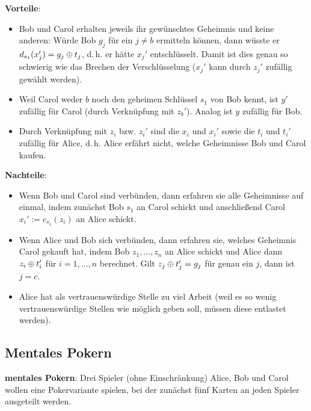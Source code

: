 \textbf{Vorteile}:
\begin{itemize}
    \item
    Bob und Carol erhalten jeweils ihr gewünschtes Geheimnis und keine anderen:
    Würde Bob $g_j$ für ein $j \not= b$ ermitteln können, dann wüsste er
    $d_{s_1}(x_j') = g_j \oplus t_j$, d.\,h. er hätte $x_j'$ entschlüsselt.
    Damit ist dies genau so schwierig wie das Brechen der Verschlüsselung
    ($x_j'$ kann durch $z_j'$ zufällig gewählt werden).

    \item
    Weil Carol weder $b$ noch den geheimen Schlüssel $s_1$ von Bob kennt,
    ist $y'$ zufällig für Carol (durch Verknüpfung mit $z_b'$).
    Analog ist $y$ zufällig für Bob.

    \item
    Durch Verknüpfung mit $z_i$ bzw. $z_i'$ sind die $x_i$ und $x_i'$
    sowie die $t_i$ und $t_i'$ zufällig für Alice,
    d.\,h. Alice erfährt nicht, welche Geheimnisse Bob und Carol kaufen.
\end{itemize}

\textbf{Nachteile}:
\begin{itemize}
    \item
    Wenn Bob und Carol sind verbünden, dann erfahren sie alle Geheimnisse auf einmal,
    indem zunächst Bob $s_1$ an Carol schickt und
    anschließend Carol $x_i' := c_{s_1}(z_i)$ an Alice schickt.

    \item
    Wenn Alice und Bob sich verbünden, dann erfahren sie, welches Geheimnis Carol gekauft hat,
    indem Bob $z_1, \dotsc, z_n$ an Alice schickt
    und Alice dann $z_i \oplus t_i'$ für $i = 1, \dotsc, n$ berechnet.
    Gilt $z_j \oplus t_j' = g_j$ für genau ein $j$, dann ist $j = c$.

    \item
    Alice hat als vertrauenswürdige Stelle zu viel Arbeit
    (weil es so wenig vertrauenswürdige Stellen wie möglich geben soll,
    müssen diese entlastet werden).
\end{itemize}

\pagebreak

\subsection{%
    Mentales Pokern%
}

\textbf{mentales Pokern}:
Drei Spieler (ohne Einschränkung) Alice, Bob und Carol wollen eine Pokervariante spielen,
bei der zunächst fünf Karten an jeden Spieler ausgeteilt werden.

